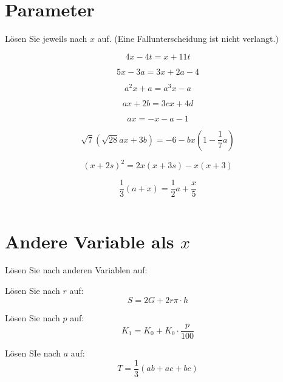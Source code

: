 \section{Parameter}
Lösen Sie jeweils nach $x$ auf. (Eine Fallunterscheidung ist nicht verlangt.)
\begin{bbwAufgabenBlock}
\item $$4x-4t = x+ 11t$$

\item $$5x-3a = 3x+2a-4$$

\item $$a^2x+a = a^3x -a$$

\item $$ax + 2b = 3cx +4d$$

\item $$ax = -x-a-1$$

\item $$\sqrt{7}\left(\sqrt{28}ax+3b\right) = -6-bx\left(1-\frac17a\right)$$

\item $$(x+2s)^2 = 2x(x+3s)-x(x+3)$$

\item $$\frac13(a+x) = \frac12 a + \frac{x}5$$

\item $$$$
\LoesungsBlock{$\lx=\{\}$}
\end{bbwAufgabenBlock}
\newpage
\section{Andere Variable als $x$}
Lösen Sie nach anderen Variablen auf:

\begin{bbwAufgabenBlock}

\item Lösen Sie nach $r$ auf:
 $$S= 2G + 2r\pi\cdot{}h$$

\item
Lösen Sie nach $p$ auf:
$$K_1 = K_0 + K_0 \cdot{}\frac{p}{100}$$

\item Lösen SIe nach $a$ auf:
$$T = \frac13 (ab + ac + bc)$$

\end{bbwAufgabenBlock}
\newpage
